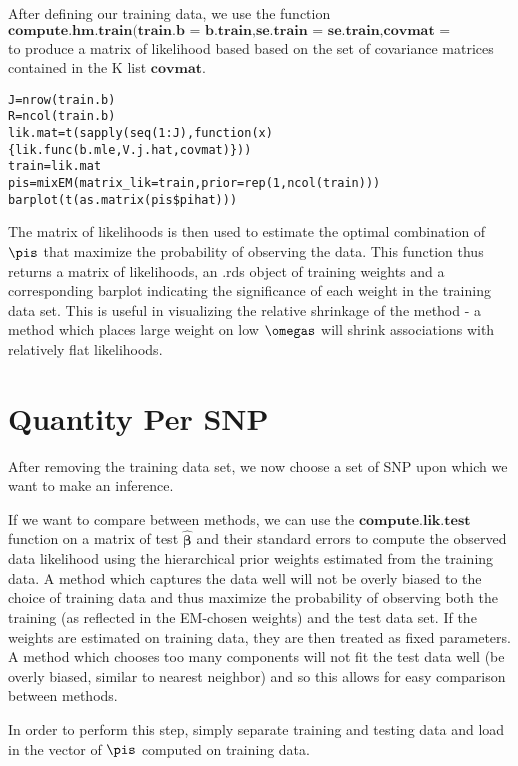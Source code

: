 \documentclass[10pt]{article}
\begin{document}
After defining our training data, we use the function $\textbf{compute.hm.train(train.b = b.train,se.train = se.train,covmat = covmat,A="Simulations")}$ to produce a matrix  of likelihood based based on the set of covariance matrices contained in the K list $\textbf{covmat}$. 

\begin{verbatim}
J=nrow(train.b)
R=ncol(train.b)
lik.mat=t(sapply(seq(1:J),function(x){lik.func(b.mle,V.j.hat,covmat)}))
train=lik.mat
pis=mixEM(matrix_lik=train,prior=rep(1,ncol(train)))
barplot(t(as.matrix(pis$pihat)))
\end{verbatim}

The matrix of likelihoods is then used to estimate the optimal combination of $\pis$ that maximize the probability of observing the data. This function thus returns a matrix of likelihoods, an .rds object of training weights and a corresponding barplot indicating the significance of each weight in the training data set. This is useful in visualizing the relative shrinkage of the method - a method which places large weight on low $\omegas$ will shrink associations with relatively flat likelihoods.


\section{Quantity Per SNP}

After removing the training data set, we now choose a set of SNP upon which we want to make an inference. 

If we want to compare between methods, we can use the $\textbf{compute.lik.test}$ function on a matrix of test $\hat{\bm{\beta}}$ and their standard errors to compute the observed data likelihood using the hierarchical prior weights estimated from the training data. A method which captures the data well will not be overly biased to the choice of training data and thus maximize the probability of observing both the training (as reflected in the EM-chosen weights) and the test data set. If the weights are estimated on training data, they are then treated as fixed parameters. A method which chooses too many components will not fit the test data well (be overly biased, similar to nearest neighbor) and so this allows for easy comparison between methods.

In order to perform this step, simply separate training and testing data and load in the vector of $\pis$ computed on training data.
\end{document}
